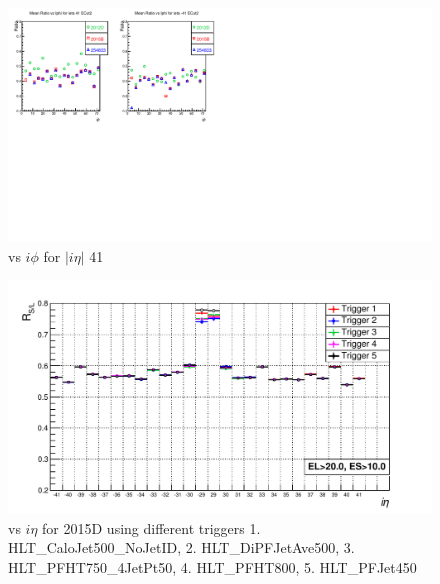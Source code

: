 \begin{figure}[h!]
\centering
\includegraphics[width=0.99\linewidth]{../Figures/Chap2/ImageFiles_HF/2012vs2015/ieta41E1E2Cut2Ietaiphi.pdf}
\caption{\ratiosl vs $i \phi$ for $|i\eta|$ 41}
\label{fig:ieta41E1E2Cut2Ietaiphi}
\end{figure}

\begin{figure}[h!]
\centering
\includegraphics[width=0.99\linewidth]{../Figures/Chap2/ImageFiles_HF/Ratio/2015vs2016/2015DRvsIetaTriggers}
\caption{\ratiosl vs $i \eta$ for 2015D using different triggers 1. HLT\_CaloJet500\_NoJetID, 2. HLT\_DiPFJetAve500, 3. HLT\_PFHT750\_4JetPt50, 4. HLT\_PFHT800, 5. HLT\_PFJet450}
\label{2015DRvsIetaTriggers}
\end{figure}



